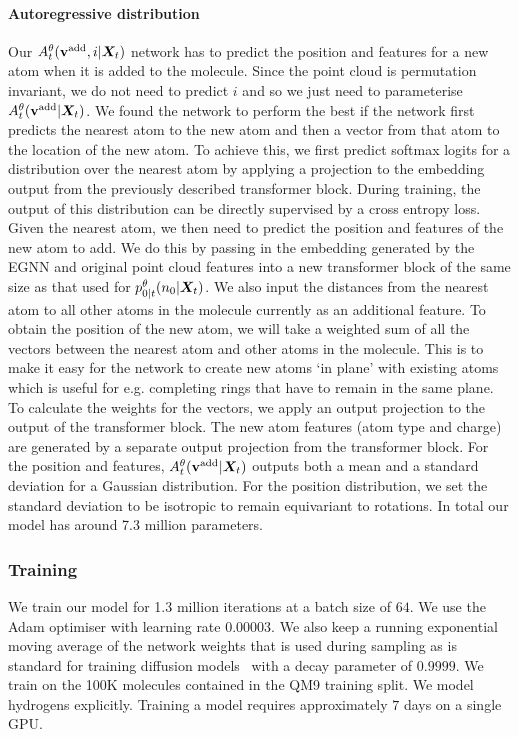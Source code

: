 \paragraph{Autoregressive distribution}
Our $A_t^\theta({\mathbf{v}}^{\textup{add}}, i | {\bm{X}}_t)$ network has to predict the position and features for a new atom when it is added to the molecule. Since the point cloud is permutation invariant, we do not need to predict $i$ and so we just need to parameterise $A_t^\theta({\mathbf{v}}^{\textup{add}} | {\bm{X}}_t)$. We found the network to perform the best if the network first predicts the nearest atom to the new atom and then a vector from that atom to the location of the new atom. To achieve this, we first predict softmax logits for a distribution over the nearest atom by applying a projection to the embedding output from the previously described transformer block. During training, the output of this distribution can be directly supervised by a cross entropy loss. Given the nearest atom, we then need to predict the position and features of the new atom to add. We do this by passing in the embedding generated by the EGNN and original point cloud features into a new transformer block of the same size as that used for $p_{0|t}^\theta(n_0 | {\bm{X}}_t)$. We also input the distances from the nearest atom to all other atoms in the molecule currently as an additional feature. To obtain the position of the new atom, we will take a weighted sum of all the vectors between the nearest atom and other atoms in the molecule. This is to make it easy for the network to create new atoms `in plane' with existing atoms which is useful for e.g. completing rings that have to remain in the same plane. To calculate the weights for the vectors, we apply an output projection to the output of the transformer block. The new atom features (atom type and charge) are generated by a separate output projection from the transformer block. For the position and features, $A_t^\theta({\mathbf{v}}^{\textup{add}} | {\bm{X}}_t)$ outputs both a mean and a standard deviation for a Gaussian distribution. For the position distribution, we set the standard deviation to be isotropic to remain equivariant to rotations. In total our model has around 7.3 million parameters.

\subsubsection{Training}
We train our model for 1.3 million iterations at a batch size of $64$. We use the Adam optimiser with learning rate $0.00003$. We also keep a running exponential moving average of the network weights that is used during sampling as is standard for training diffusion models~\citep{ho2020denoising, song2020score, karras2022elucidating} with a decay parameter of $0.9999$. We train on the 100K molecules contained in the QM9 training split. We model hydrogens explicitly. Training a model requires approximately $7$ days on a single GPU.

